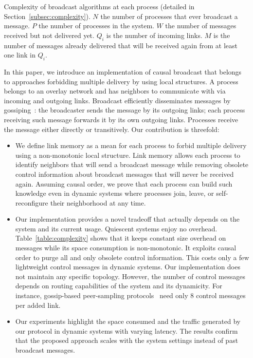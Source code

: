 \begin{table*}
  \begin{center}
    \caption{\label{table:complexity} Complexity of broadcast algorithms at each
      process (detailed in Section~\ref{subsec:complexity}). $N$ the number of
      processes that ever broadcast a message. $P$ the number of processes in
      the system. $W$ the number of messages received but not delivered
      yet. $Q_i$ is the number of incoming links. $M$ is the number of
      messages already delivered that will be received again from at least one
      link in $Q_i$.}
  
  \end{center}
\end{table*}

In this paper, we introduce an implementation of causal broadcast that belongs
to approaches forbidding multiple delivery by using local structures. A process
belongs to an overlay network and has neighbors to communicate with via incoming
and outgoing links.  Broadcast efficiently disseminates messages by
gossiping~\cite{jelasity2007gossip}: the broadcaster sends the message by its
outgoing links; each process receiving such message forwards it by its own
outgoing links. Processes receive the message either directly or
transitively. Our contribution is threefold:
\begin{itemize}[leftmargin=*]
\item We define link memory as a mean for each process to forbid multiple
  delivery using a non-monotonic local structure. Link memory allows each
  process to identify neighbors that will send a broadcast message while
  removing obsolete control information about broadcast messages that will never
  be received again. Assuming causal order, we prove that each process can build
  such knowledge even in dynamic systems where processes join, leave, or
  self-reconfigure their neighborhood at any time.
\item Our implementation provides a novel tradeoff that actually depends on
  the system and its current usage. Quiescent systems enjoy no
  overhead. Table~\ref{table:complexity} shows that it keeps constant size
  overhead on messages while its space consumption is non-monotonic. It exploits
  causal order to purge all and only obsolete control information. This costs
  only a few lightweight control messages in dynamic systems.  Our implementation
  does not maintain any specific topology. However, the number of control
  messages depends on routing capabilities of the system and its dynamicity. For
  instance, gossip-based peer-sampling
  protocols~\cite{jelasity2007gossip,jelasity2009tman,nedelec2017adaptive} need
  only 8 control messages per added link. %
\item Our experiments highlight the space consumed and the traffic generated by
  our protocol in dynamic systems with varying latency. The results confirm that
  the proposed approach scales with the system settings instead of past
  broadcast messages.
\end{itemize}
